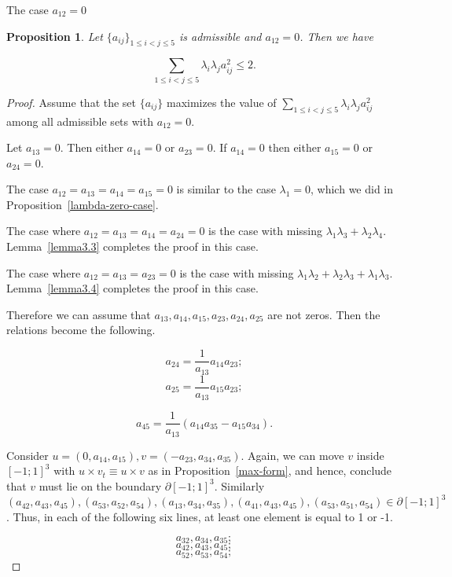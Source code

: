 \documentclass[12pt]{article}
\newtheorem{proposition}{Proposition}[section]
\begin{document}
\begin{section}{The case \texorpdfstring{$a_{12} = 0$}{Lg}}
    \begin{proposition}
        \label{zero-case}
        Let  $\{a_{ij}\}_{1\leq i<j\leq 5}$ is admissible and $a_{12}=0$. Then we have
    
        $$
             \sum_{1\leq i<j\leq 5}\lambda_{i}\lambda_{j}a_{ij}^2 \leq 2.
        $$
    \end{proposition}
    
    \begin{proof}
        Assume that the set $\{a_{ij}\}$ maximizes the value of $\sum_{1\leq i<j\leq 5}\lambda_{i}\lambda_{j}a_{ij}^2$ among all admissible sets with $a_{12}=0.$ 
    
        Let $a_{13}=0$. Then either $a_{14}=0$ or $a_{23}=0$. If $a_{14}=0$ then either $a_{15}=0$ or $a_{24}=0$. 

        The case $a_{12}=a_{13}=a_{14}=a_{15}=0$ is similar to the case $\lambda_{1} =0$, which we did in Proposition~\ref{lambda-zero-case}. 
        
        The case where $a_{12}=a_{13}=a_{14}=a_{24}=0$ is the case with missing $\lambda_{1}\lambda_{3} + \lambda_{2}\lambda_{4}$. Lemma~\ref{lemma3.3} completes the proof in this case. 

        The case where $a_{12}=a_{13}=a_{23}=0$ is the case with missing $\lambda_{1}\lambda_{2} + \lambda_{2}\lambda_{3} + \lambda_{1}\lambda_{3}$. Lemma~\ref{lemma3.4} completes the proof in this case.

        Therefore we can assume that $a_{13},a_{14},a_{15},a_{23},a_{24},a_{25}$ are not zeros. Then the relations become the following.

        $$
            a_{24} = \frac{1}{a_{13}}a_{14}a_{23}; 
        $$
        $$
            a_{25} = \frac{1}{a_{13}}a_{15}a_{23};
        $$

        $$
            a_{45} = \frac{1}{a_{13}}(a_{14}a_{35} - a_{15}a_{34}).
        $$

        Consider $u=(0, a_{14},a_{15}), v=(-a_{23}, a_{34},a_{35})$.  Again, we can move $v$ inside $[-1;1]^3$ with $u\times v_{t} \equiv u\times v$ as in Proposition~\ref{max-form}, and hence,  conclude that $v$ must lie on the boundary $\partial [-1;1]^3.$ Similarly $(a_{42},a_{43},a_{45}), (a_{53},a_{52},a_{54}),(a_{13}, a_{34},a_{35}),(a_{41},a_{43},a_{45}),(a_{53},a_{51},a_{54}) \in \partial [-1;1]^{3}$. Thus, in each of the following six lines, at least one element is equal to 1 or -1.

        $$
            a_{32},a_{34},a_{35};
        $$
        $$
            a_{42},a_{43},a_{45};
        $$
        $$
            a_{52},a_{53},a_{54};
        $$


\end{proof}
\end{section}
\end{document}

